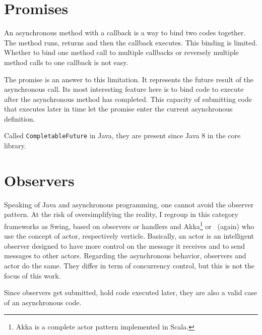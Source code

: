
\section{Promises}

An asynchronous method with a callback is a way to bind two codes together. The method runs, returns and then the callback executes. This binding is limited. Whether to bind one method call to multiple callbacks or reversely multiple method calls to one callback is not easy. 

The promise is an answer to this limitation. It represents the future result of the asynchronous call. Its most interesting feature here is to bind code to execute after the asynchronous method has completed. This capacity of submitting code that executes later in time let the promise enter the current asynchronous definition.

Called \lstinline{CompletableFuture} in Java, they are present since Java 8 in the core library.


\section{Observers}

Speaking of Java and asynchronous programming, one cannot avoid the observer pattern. At the risk of oversimplifying the reality, I regroup in this category frameworks as Swing, based on observers or handlers and Akka\footnote{Akka is a complete actor pattern implemented in Scala.} or \vertx\ (again) who use the concept of actor, respectively verticle. Basically, an actor is an intelligent observer designed to have more control on the message it receives and to send messages to other actors. Regarding the asynchronous behavior, observers and actor do the same. They differ in term of concurrency control, but this is not the focus of this work.

Since observers get submitted, hold code executed later, they are also a valid case of an asynchronous code.
